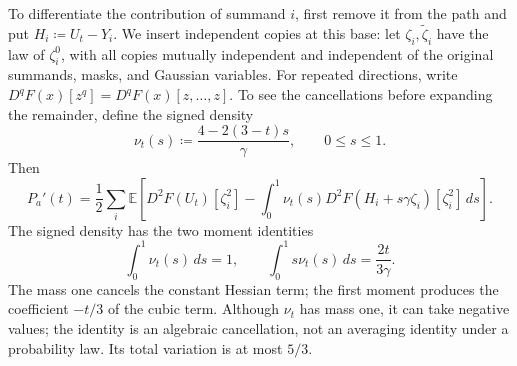 \documentclass[11pt,letterpaper]{article}
\theoremstyle{remark}
\newcommand{\E}{\mathbb E}
\newcommand{\dd}{\,d}
\begin{document}
To differentiate the contribution of summand \(i\), first remove it
from the path and put \(H_i\coloneqq U_t-Y_i\). We insert independent
copies at this base: let \(\zeta_i,\widetilde\zeta_i\) have the law of
\(\zeta_i^0\), with all copies mutually independent and independent
of the original summands, masks, and Gaussian variables.
For repeated directions, write
\(D^qF(x)[z^q]=D^qF(x)[z,\ldots,z]\).
To see the cancellations before expanding the remainder, define the
signed density
\[
 \nu_t(s)\coloneqq \frac{4-2(3-t)s}{\gamma},\qquad 0\le s\le1.
\]
Then
\begin{equation}
 P_a'(t)=\frac12\sum_i\E\left[
 D^2F(U_t)[\zeta_i^2]
 -\int_0^1\nu_t(s)
       D^2F(H_i+s\gamma\zeta_i)[\zeta_i^2]\dd s\right].
 \label{appx-an:signed-hessian}
\end{equation}
The signed density has the two moment identities
\begin{equation}
 \int_0^1\nu_t(s)\dd s=1,\qquad
 \int_0^1s\nu_t(s)\dd s=\frac{2t}{3\gamma}.
 \label{appx-an:signed-moments}
\end{equation}
The mass one cancels the constant Hessian term; the first moment
produces the coefficient \(-t/3\) of the cubic term.
Although \(\nu_t\) has mass one, it can take negative values; the
identity is an algebraic cancellation, not an averaging identity
under a probability law. Its total variation is at most \(5/3\).
\end{document}
